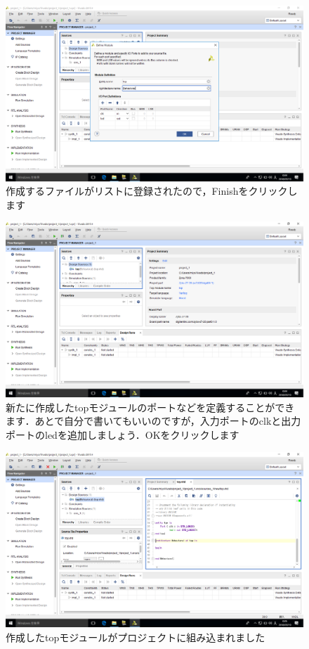 \documentclass[a4paper,dvipdfmx]{jsarticle}
\begin{document}
 \begin{figure}[H]
  \begin{center}
   \includegraphics[width=.8\textwidth]{chapter03_figures/VirtualBox_Windows10_19_03_2018_00_04_44.png}
  \end{center}
  \caption{作成するファイルがリストに登録されたので，Finishをクリックします}
 \end{figure}

 \begin{figure}[H]
  \begin{center}
   \includegraphics[width=.8\textwidth]{chapter03_figures/VirtualBox_Windows10_19_03_2018_00_04_59.png}
  \end{center}
  \caption{新たに作成したtopモジュールのポートなどを定義することができます．あとで自分で書いてもいいのですが，入力ポートのclkと出力ポートのledを追加しましょう．OKをクリックします}
 \end{figure}

 \begin{figure}[H]
  \begin{center}
   \includegraphics[width=.8\textwidth]{chapter03_figures/VirtualBox_Windows10_19_03_2018_00_05_13.png}
  \end{center}
  \caption{作成したtopモジュールがプロジェクトに組み込まれました}
 \end{figure}
\end{document}
